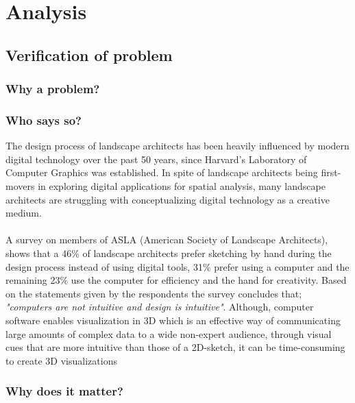 \chapter{Analysis}
	
		
	\section{Verification of problem}\label{sec:verification}
		
 	\subsection{Why a problem?}
 	
 	\subsection{Who says so?}
 	The design process of landscape architects has been heavily influenced by modern digital technology over the past 50 years, since Harvard's Laboratory of Computer Graphics was established.\cite{landscapeArchitectureDigiTech} In spite of landscape architects being first-movers in exploring digital applications for spatial analysis, many landscape architects are struggling with conceptualizing digital technology as a creative medium\cite{landscapeArchitectureDigiTech}. \\
 	\\
 	A survey on members of ASLA (American Society of Landscape Architects)\cite{surveySketchVSDigital}, shows that a 46\% of landscape architects prefer sketching by hand during the design process instead of using digital tools, 31\% prefer using a computer and the remaining 23\% use the computer for efficiency and the hand for creativity. Based on the statements given by the respondents the survey concludes that; \textit{"computers are not intuitive and design is intuitive"}\cite{landscapeArchitectureDigiTech}\cite{surveySketchVSDigital}. Although, computer software enables visualization in 3D which is an effective way of communicating large amounts of complex data to a wide non-expert audience, through visual cues that are more intuitive than those of a 2D-sketch, it can be time-consuming to create 3D visualizations\cite{landscapeVisual}
 	
 	\subsection{Why does it matter?}
 	
